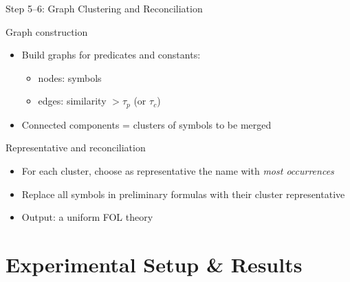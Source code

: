 \documentclass[presentation]{beamer}
\begin{document}
{\begin{frame}{Step 5–6: Graph Clustering and Reconciliation}
\begin{block}{Graph construction}
\begin{itemize}
    \item Build graphs for predicates and constants:
    \begin{itemize}
        \item nodes: symbols
        \item edges: similarity $> \tau_p$ (or $\tau_c$)
    \end{itemize}
    \item Connected components = clusters of symbols to be merged
\end{itemize}
\end{block}

\begin{block}{Representative and reconciliation}
\begin{itemize}
    \item For each cluster, choose as representative the name with \emph{most occurrences}
    \item Replace all symbols in preliminary formulas with their cluster representative
    \item Output: a \alert{uniform} FOL theory
\end{itemize}
\end{block}

\end{frame}

} %

\section[Experiment]{Experimental Setup \& Results}
\end{document}
